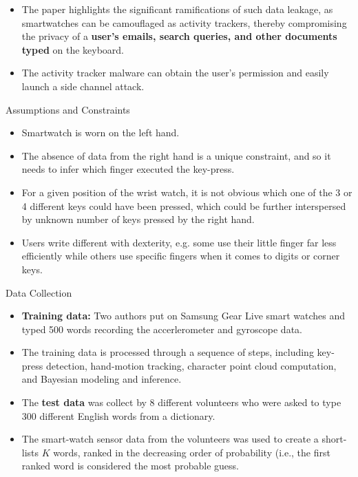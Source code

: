 \documentclass[ucs,9pt]{beamer}
\begin{document}
\begin{frame}
 \begin{itemize}
 	\item The paper highlights the significant ramifications
 	of such data leakage, as smartwatches can be camouflaged
 	as activity trackers, thereby compromising the privacy of a
 	\textbf{user’s emails, search queries, and other documents typed} on
 	the keyboard. 
 	
 	\item %
 	The activity tracker malware can obtain the	user’s permission and easily launch a side channel attack. 	
 \end{itemize}
\end{frame}

\begin{frame}{Assumptions and Constraints}
	\begin{itemize}
		\item Smartwatch is worn on the left hand.
		\item The absence of data from the right hand is a unique constraint, and so it needs to infer which finger	executed the key-press.
		\item For a given position of the wrist watch, it is not obvious which one of the 3 or 4 different keys could have been pressed, which could be further interspersed by unknown number of keys pressed by the right hand. 
		\item Users write different with dexterity, e.g. some use their little
		finger far less efficiently while others use specific fingers when
		it comes to digits or corner keys.
	\end{itemize}
\end{frame}

\begin{frame}{Data Collection}
	\begin{itemize}
		\item \textbf{Training data:} Two authors put on Samsung Gear Live
		smart watches and typed 500 words recording the accerlerometer and gyroscope data.
		\item The training data is processed through a sequence of steps, including key-press detection, hand-motion tracking,
		character point cloud computation, and Bayesian modeling and
		inference.
		\item The \textbf{test data} was collect by 8 different volunteers
		who were asked to type 300 different English words from a
		dictionary.
		\item The smart-watch sensor data from the volunteers
		was used to create a short-lists $K$ words, ranked in the
		decreasing order of probability (i.e., the first ranked word is
		considered the most probable guess.
	\end{itemize}	
\end{frame}
\end{document}
